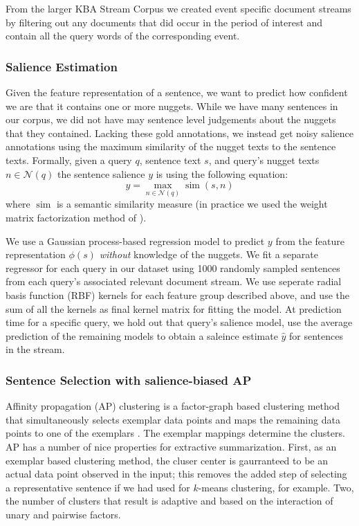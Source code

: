 From the larger KBA Stream Corpus we created event specific document 
streams by filtering out any documents that did occur in the period
of interest and contain all the query words of the corresponding event.  



\subsubsection{Salience Estimation}

Given the feature representation of a sentence, we want to predict how
confident we are that it contains one or more nuggets. While we have
many sentences in our corpus, we did not have may sentence level judgements
about the nuggets that they contained. 
Lacking these gold annotations, we instead get noisy salience annotations 
using the maximum similarity of the nugget texts to the sentence texts.
Formally, given a query $q$, sentence text $s$, and query's nugget texts $n \in \mathcal{N}(q)$
the sentence salience $y$ is 
using the following equation:
\[ y = \max_{n \in  \mathcal{N}(q)} \operatorname{sim}(s, n)\]
where $\operatorname{sim}$ is a semantic similarity measure (in practice
we used the weight matrix factorization method of \cite{wmtf}).

We use a Gaussian process-based regression model \cite{gp} to predict $y$ from
the feature representation $\phi(s)$ \emph{without} knowledge of the nuggets.
We fit a separate regressor for each query in our dataset using 1000
randomly sampled sentences from each query's associated relevant document 
stream. We use seperate radial basis function (RBF) kernels for each 
feature group described above, and use the sum of all the kernels as final
kernel matrix for fitting the model.
At prediction time for a specific query, we hold out that query's salience
model, use the average prediction of the remaining models to obtain
a saleince estimate $\hat{y}$ for sentences in the stream.

\subsubsection{Sentence Selection with salience-biased AP}


    Affinity propagation (AP) clustering is a factor-graph based clustering
    method that simultaneously selects exemplar data points and maps 
    the remaining data points to one of the exemplars \cite{frey}. 
    The exemplar mappings determine the clusters.
    AP has a number of nice properties for extractive summarization.
    First, as an exemplar based clustering method, the cluser center
    is gaurranteed to be an actual data point observed in the input; 
    this removes the added step of selecting a representative sentence
    if we had used for $k$-means clustering, for example.
    Two, the number of clusters that result is adaptive and 
    based on the interaction of unary and pairwise factors.

